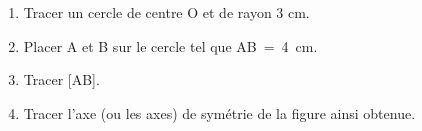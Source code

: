 \documentclass[exercice]{thedocument}%
\begin{document}
%
\begin{enumerate}
    \item Tracer un cercle de centre O et de rayon 3 cm.
    \item Placer A et B sur le cercle tel que AB~=~4~cm.
    \item Tracer [AB].
    \item Tracer l'axe (ou les axes) de symétrie de la figure ainsi obtenue.
\end{enumerate}
\end{document}
